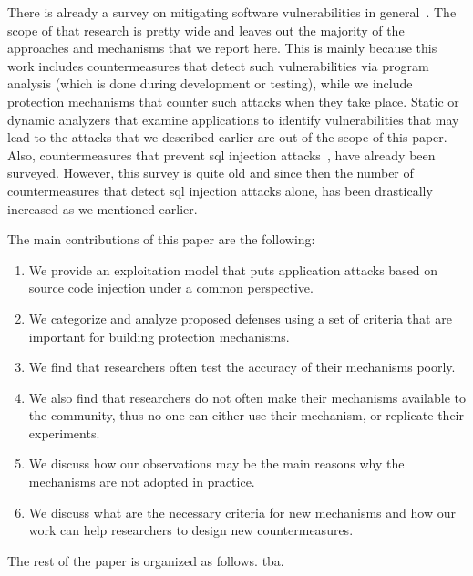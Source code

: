 \documentclass[conference]{IEEEtran}
\begin{document}
There is already a survey on mitigating software vulnerabilities
in general~\cite{SZ12}. The scope of that
research is pretty wide and leaves out the majority of the
approaches and mechanisms that we report here.
This is mainly because this work includes countermeasures
that detect such vulnerabilities via program analysis
(which is done during development or testing), while
we include protection mechanisms that counter
such attacks when they take place. Static or
dynamic analyzers that examine applications to
identify vulnerabilities that may lead to the attacks
that we described earlier are out of the scope of this paper.
Also, countermeasures that prevent {\sc sql}
injection attacks~\cite{HVO06}, have already been surveyed.
However, this survey is quite old and since then
the number of countermeasures that detect {\sc sql}
injection attacks alone, has been drastically increased
as we mentioned earlier.

The main contributions of this paper are the following:

\begin{enumerate}
\item We provide an exploitation model that puts application attacks
  based on source code injection under a common
  perspective.
\item We categorize and analyze proposed defenses using a set of
  criteria that are important for building protection mechanisms.
\item We find that researchers often test the accuracy
  of their mechanisms poorly. 
\item We also find that researchers do not often make their mechanisms
  available to the community, thus no one can either use their
  mechanism, or replicate their experiments.
\item We discuss how our observations may be the main reasons why the
  mechanisms are not adopted in practice.
\item We discuss what are the necessary criteria for new mechanisms
  and how our work can help researchers to design new countermeasures.
\end{enumerate}

The rest of the paper is organized as follows. {\sc tba}.

\end{document}

